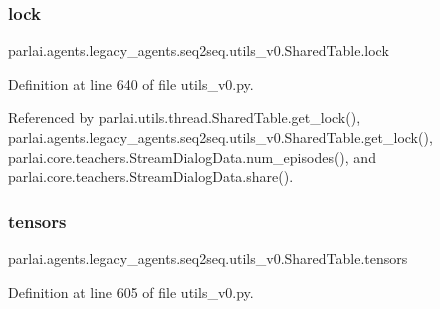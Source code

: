 \subsubsection{\texorpdfstring{lock}{lock}}
{\footnotesize\ttfamily parlai.\+agents.\+legacy\+\_\+agents.\+seq2seq.\+utils\+\_\+v0.\+Shared\+Table.\+lock}



Definition at line 640 of file utils\+\_\+v0.\+py.



Referenced by parlai.\+utils.\+thread.\+Shared\+Table.\+get\+\_\+lock(), parlai.\+agents.\+legacy\+\_\+agents.\+seq2seq.\+utils\+\_\+v0.\+Shared\+Table.\+get\+\_\+lock(), parlai.\+core.\+teachers.\+Stream\+Dialog\+Data.\+num\+\_\+episodes(), and parlai.\+core.\+teachers.\+Stream\+Dialog\+Data.\+share().

\mbox{\label{classparlai_1_1agents_1_1legacy__agents_1_1seq2seq_1_1utils__v0_1_1SharedTable_a10fd3cbec22c17f5e522d7813f3d3056}} 
\subsubsection{\texorpdfstring{tensors}{tensors}}
{\footnotesize\ttfamily parlai.\+agents.\+legacy\+\_\+agents.\+seq2seq.\+utils\+\_\+v0.\+Shared\+Table.\+tensors}



Definition at line 605 of file utils\+\_\+v0.\+py.



